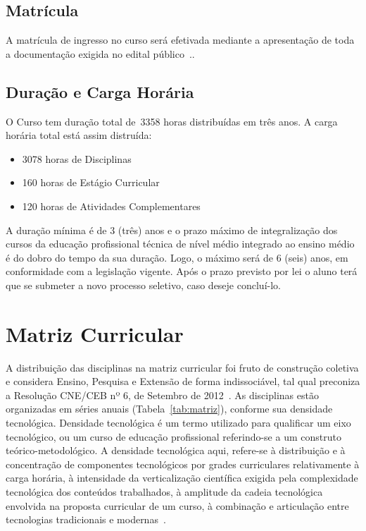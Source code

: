 \documentclass[11pt,fleqn]{book} %
\newcommand{\VER}[1]{\begingroup\color{red}#1\endgroup}
\begin{document}
\subsection{Matrícula}

A matrícula de ingresso no curso será efetivada mediante a apresentação de toda a documentação exigida no edital público~\cite{Resolucao22De2011}..

\subsection{Duração e Carga Horária}
\indent

O Curso tem duração total de~\VER{3358} horas distribuídas em três anos.
A carga horária total está assim distruída:
\begin{itemize}
	\item \VER{3078} horas de Disciplinas
	\item \VER{160} horas de Estágio Curricular
	\item \VER{120} horas de Atividades Complementares
\end{itemize}

A duração mínima é de 3 (três) anos e o prazo máximo de integralização dos cursos da educação profissional técnica de nível médio integrado ao ensino médio é do dobro do tempo da sua duração. 
Logo, o máximo será de 6 (seis) anos, em conformidade com a legislação vigente. 
Após o prazo previsto por lei o aluno terá que se submeter a novo processo seletivo, caso deseje concluí-lo.


\section{Matriz Curricular}\label{matriz}
\indent
%
%

A distribuição das disciplinas na matriz curricular foi fruto de construção coletiva e considera Ensino, Pesquisa e Extensão de forma indissociável, tal qual preconiza  a Resolução CNE/CEB nº 6, de Setembro de 2012~\cite{Resolucao06De2012}.
As disciplinas estão organizadas em séries anuais (Tabela~\ref{tab:matriz}), conforme sua densidade tecnológica.
Densidade tecnológica é um termo utilizado para qualificar um eixo tecnológico, ou um curso de educação profissional referindo-se a um construto teórico-metodológico. 
A densidade tecnológica aqui, refere-se à distribuição e à concentração de componentes tecnológicos por grades curriculares relativamente à carga horária, à intensidade da verticalização científica exigida pela complexidade tecnológica dos conteúdos trabalhados, à amplitude da cadeia tecnológica envolvida na proposta curricular de um curso, à combinação e articulação entre tecnologias tradicionais e modernas~\cite{Machado2010}.
\end{document}
